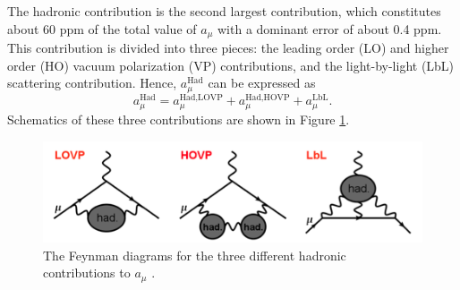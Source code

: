 \documentclass{outhesis}
\begin{document}
The hadronic contribution is the second largest contribution, which constitutes about 60 ppm of the total value of $a_{\mu}$ with a dominant error of about 0.4 ppm. %
This contribution is divided into three pieces: the leading order (LO) and higher order (HO) vacuum polarization (VP) contributions, and the light-by-light (LbL) scattering contribution. Hence, $a_{\mu}^{\text{Had}}$ can be expressed as
\begin{equation}
a_{\mu}^{\text{Had}} = a_{\mu}^{\text{Had,LOVP}}+a_{\mu}^{\text{Had,HOVP}} + a_{\mu}^{\text{LbL}}.
\end{equation}
Schematics of these three contributions are shown in Figure \ref{fig:had}.
\begin{figure}
  \centering
  \includegraphics[scale=0.5]{figures/had}
   \caption[Feynman diagram of some hadronic contributions]{The Feynman diagrams for the three different hadronic contributions to $a_{\mu}$ \cite{thesis}.}
  \label{fig:had}
\end{figure}
\end{document}
